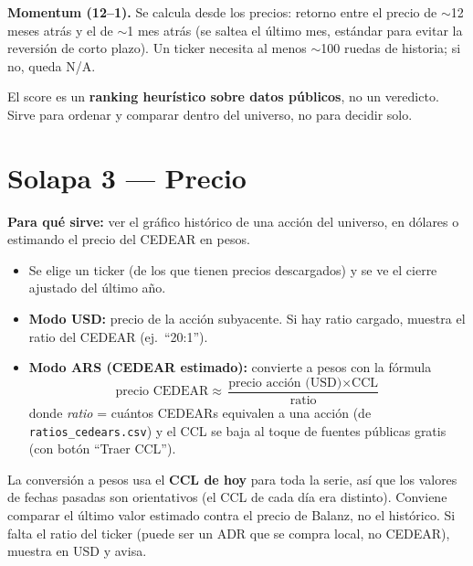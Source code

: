 \documentclass[11pt,a4paper]{article}
\newcommand{\fpath}[1]{\texttt{#1}}
\begin{document}
\noindent\textbf{Momentum (12--1).} Se calcula desde los precios: retorno entre el
precio de $\sim$12 meses atr\'as y el de $\sim$1 mes atr\'as (se saltea el \'ultimo
mes, est\'andar para evitar la reversi\'on de corto plazo). Un ticker necesita al
menos $\sim$100 ruedas de historia; si no, queda N/A.

\begin{nota}
El score es un \textbf{ranking heur\'istico sobre datos p\'ublicos}, no un veredicto.
Sirve para ordenar y comparar dentro del universo, no para decidir solo.
\end{nota}

\section{Solapa 3 --- Precio}

\textbf{Para qu\'e sirve:} ver el gr\'afico hist\'orico de una acci\'on del universo, en
d\'olares o estimando el precio del CEDEAR en pesos.

\begin{itemize}[leftmargin=1.4em]
  \item Se elige un ticker (de los que tienen precios descargados) y se ve el cierre
  ajustado del \'ultimo a\~no.
  \item \textbf{Modo USD:} precio de la acci\'on subyacente. Si hay ratio cargado,
  muestra el ratio del CEDEAR (ej.\ ``20:1'').
  \item \textbf{Modo ARS (CEDEAR estimado):} convierte a pesos con la f\'ormula
  \[
    \text{precio CEDEAR} \approx \frac{\text{precio acci\'on (USD)} \times \text{CCL}}{\text{ratio}}
  \]
  donde \emph{ratio} = cu\'antos CEDEARs equivalen a una acci\'on (de
  \fpath{ratios\_cedears.csv}) y el CCL se baja al toque de fuentes p\'ublicas gratis
  (con bot\'on ``Traer CCL'').
\end{itemize}

\begin{nota}
La conversi\'on a pesos usa el \textbf{CCL de hoy} para toda la serie, as\'i que los
valores de fechas pasadas son orientativos (el CCL de cada d\'ia era distinto).
Conviene comparar el \'ultimo valor estimado contra el precio de Balanz, no el
hist\'orico. Si falta el ratio del ticker (puede ser un ADR que se compra local, no
CEDEAR), muestra en USD y avisa.
\end{nota}

\end{document}
